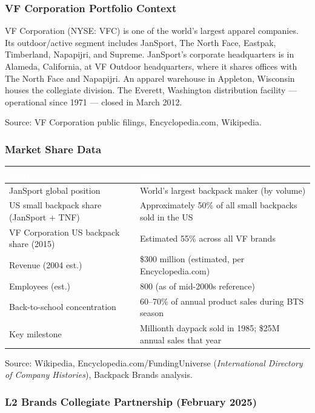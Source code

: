 \documentclass[11pt,letterpaper]{article}
\newcommand{\tableheader}[1]{\textbf{\sffamily\textcolor{white}{#1}}}
\begin{document}
\subsubsection{VF Corporation Portfolio Context}

VF Corporation (NYSE: VFC) is one of the world's largest apparel companies. Its outdoor/active segment includes JanSport, The North Face, Eastpak, Timberland, Napapijri, and Supreme. JanSport's corporate headquarters is in Alameda, California, at VF Outdoor headquarters, where it shares offices with The North Face and Napapijri. An apparel warehouse in Appleton, Wisconsin houses the collegiate division. The Everett, Washington distribution facility --- operational since 1971 --- closed in March 2012.

Source: VF Corporation public filings, Encyclopedia.com, Wikipedia.

\subsubsection{Market Share Data}

\begin{center}
\begin{tabularx}{\textwidth}{XL{6cm}}
\toprule
{}
\tableheader{Metric} & \tableheader{Data} \\
\midrule
JanSport global position & World's largest backpack maker (by volume) \\
US small backpack share (JanSport + TNF) & Approximately 50\% of all small backpacks sold in the US \\
VF Corporation US backpack share (2015) & Estimated 55\% across all VF brands \\
Revenue (2004 est.) & \$300 million (estimated, per Encyclopedia.com) \\
Employees (est.) & 800 (as of mid-2000s reference) \\
Back-to-school concentration & 60--70\% of annual product sales during BTS season \\
Key milestone & Millionth daypack sold in 1985; \$25M annual sales that year \\
\bottomrule
\end{tabularx}
\end{center}

Source: Wikipedia, Encyclopedia.com/FundingUniverse (\textit{International Directory of Company Histories}), Backpack Brands analysis.

\subsubsection{L2 Brands Collegiate Partnership (February 2025)}
\end{document}
